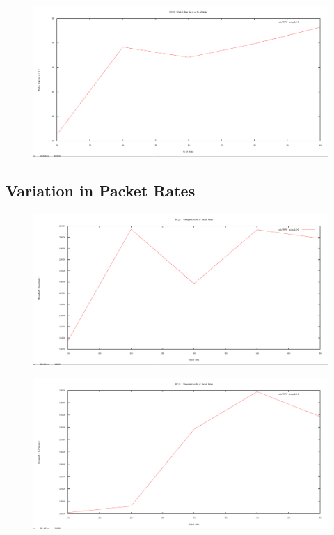 \documentclass[12pt]{article}
\begin{document}
\begin{figure}[H]
	\centering
	\includegraphics[scale=	0.26]{image/apics/am_packetdropratio_nodes.png}
\end{figure}



\subsection{Variation in Packet Rates}
\newpage

\begin{figure}[H]
	\centering
	\includegraphics[scale=	0.26]{image/bpics/bm_Throughput_vs_packetrates.png}
\end{figure}

\begin{figure}[H]
	\centering
	\includegraphics[scale=	0.26]{image/apics/am_Throughput_vs_packetrates.png}
\end{figure}
\end{document}
